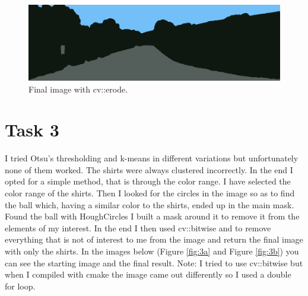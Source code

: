 \begin{figure}[h]
	\centering
        \begin{minipage}{0.9\textwidth}
        		\centering
		\includegraphics[width=\linewidth]{images/source/task2/2}
		\caption{Final image with cv::erode.}
		\label{fig:2c}
        \end{minipage}
\end{figure}

\chapter{Task 3}
I tried Otsu’s thresholding and k-means in different variations but unfortunately none of them worked. The shirts were always clustered incorrectly. In the end I opted for a simple method, that is through the color range. I have selected the color range of the shirts. Then I looked for the circles in the image so as to find the ball which, having a similar color to the shirts, ended up in the main mask. Found the ball with HoughCircles I built a mask around it to remove it from the elements of my interest. In the end I then used cv::bitwise and to remove everything that is not of interest to me from the image and return the final image with only the shirts. In the images below (Figure \ref{fig:3a} and Figure \ref{fig:3b}) you can see the starting image and the final result.
Note: I tried to use cv::bitwise but when I compiled with cmake the image came out differently so I used a double for loop.

